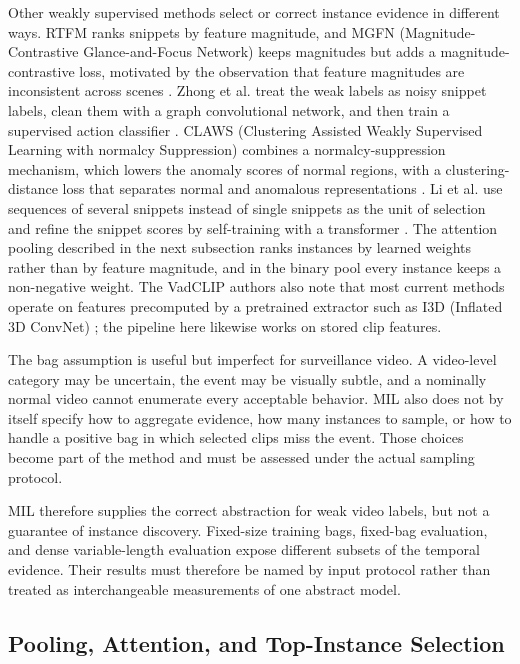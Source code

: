 Other weakly supervised methods select or correct instance evidence in
different ways. RTFM ranks snippets by feature magnitude, and MGFN (Magnitude-Contrastive
Glance-and-Focus Network) keeps
magnitudes but adds a magnitude-contrastive loss, motivated by the observation
that feature magnitudes are inconsistent across scenes
\cite{tian2021weakly,chen2023mgfn}. Zhong et al. treat the weak labels as noisy
snippet labels, clean them with a graph convolutional network, and then train a
supervised action classifier \cite{zhong2019graph}. CLAWS (Clustering Assisted
Weakly Supervised Learning with normalcy Suppression) combines a
normalcy-suppression mechanism, which lowers the anomaly scores of normal
regions, with a clustering-distance loss that separates normal and anomalous
representations \cite{zaheer2020claws}. Li et al. use sequences of several
snippets instead of single snippets as the unit of selection and refine the
snippet scores by self-training with a transformer \cite{li2022self}. The
attention pooling described in the next subsection ranks instances by learned
weights rather than by feature magnitude, and in the binary pool every instance
keeps a non-negative weight. The VadCLIP authors also note that most current
methods operate on features precomputed by a pretrained extractor such as I3D
(Inflated 3D ConvNet)
\cite{wu2024vadclip,carreira2017quo}; the pipeline here likewise works on stored
clip features.

The bag assumption is useful but imperfect for surveillance video. A video-level
category may be uncertain, the event may be visually subtle, and a nominally
normal video cannot enumerate every acceptable behavior. MIL also does not by
itself specify how to aggregate evidence, how many instances to sample, or how
to handle a positive bag in which selected clips miss the event. Those choices
become part of the method and must be assessed under the actual sampling
protocol.

MIL therefore supplies the correct abstraction for weak video labels, but
not a guarantee of instance discovery. Fixed-size training bags, fixed-bag
evaluation, and dense variable-length evaluation expose different subsets of
the temporal evidence. Their results must therefore be named by input protocol
rather than treated as interchangeable measurements of one abstract model.

\subsection{Pooling, Attention, and Top-Instance Selection}

